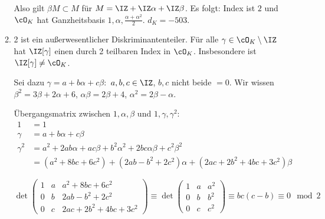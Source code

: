 \begin{Beispiel}
\begin{enumerate}
\begin{enumerate}
Also gilt $\beta M\subset M$ für $M=\IZ+\IZ\alpha + \IZ\beta$.
Es folgt: Index ist $2$ und $\cO_K$ hat Ganzheitsbasis $1,\alpha,\frac{\alpha+\alpha^2}{2}$. $d_K=-503$.
\item 2 ist ein außerwesentlicher Diskriminantenteiler. Für alle $\gamma\in \cO_K\setminus \IZ$ hat $\IZ[\gamma]$ einen durch 2 teilbaren Index in $\cO_K$. Insbesondere ist $\IZ[\gamma]\neq \cO_K$.

Sei dazu $\gamma=a+b\alpha+ c\beta:$ $a,b,c\in\IZ$, $b,c$ nicht beide $=0$. Wir wissen $\beta^2=3\beta+2\alpha+6$, $\alpha\beta=2\beta+4$, $\alpha^2=2\beta-\alpha$.

Übergangsmatrix zwischen $1,\alpha,\beta$ und $1,\gamma,\gamma^2$:
\begin{align*}
1&=1\\ 
\gamma&=a+b\alpha+c\beta\\
\gamma^2&=a^2+2ab\alpha+ac\beta+b^2\alpha^2+2bc\alpha\beta+c^2\beta^2\\
&=(a^2+8bc+6c^2)+(2ab-b^2+2c^2)\alpha + (2ac+2b^2+4bc+3c^2)\beta
\end{align*}

$\det \begin{pmatrix}
       1 & a & a^2+8bc+6c^2\\
       0 & b & 2ab-b^2+2c^2\\
       0 & c & 2ac+2b^2+4bc+3c^2
      \end{pmatrix}\equiv
      \det \begin{pmatrix}
       1 & a & a^2\\
       0 & b & b^2\\
       0 & c & c^2
      \end{pmatrix}\equiv bc(c-b) \equiv 0 \mod{2}
$
\end{enumerate}
\end{enumerate}
\end{Beispiel}





